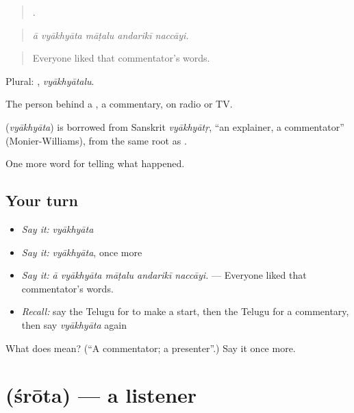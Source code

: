 \begin{quote}
    .
\end{quote}

\begin{quote}
\emph{ā vyākhyāta māṭalu andarikī naccāyi.}
\end{quote}

\begin{quote}
Everyone liked that commentator's words.
\end{quote}

Plural: , \emph{vyākhyātalu}.

The person behind a , a commentary, on radio or TV.

\begin{cousinweb}
\textbf{} (\emph{vyākhyāta}) is borrowed from Sanskrit \emph{vyākhyātṛ}, \textquotedblleft{}an explainer, a commentator\textquotedblright{} (Monier-Williams), from the same root as .
\end{cousinweb}

\begin{grammarlens}[title={What you've built}]
One more word for telling what happened.
\end{grammarlens}

\subsection*{Your turn}
\begin{itemize}
\raggedright
  \item \emph{Say it:} \emph{vyākhyāta}
  \item \emph{Say it:} \emph{vyākhyāta}, once more
  \item \emph{Say it:} \emph{ā vyākhyāta māṭalu andarikī naccāyi.} — Everyone liked that commentator's words.
  \item \emph{Recall:} say the Telugu for to make a start, then the Telugu for a commentary, then say \emph{vyākhyāta} again
\end{itemize}

\begin{tcolorbox}[breakable,colback=teal!4,colframe=teal!35!black,title={Before you move on}]
What does  mean? (\textquotedblleft{}A commentator; a presenter\textquotedblright{}.) Say it once more.
\end{tcolorbox}
\section[\texorpdfstring{\te{శ్రోత} (śrōta)}{శ్రోత (śrōta)}]{ (śrōta) — a listener}

